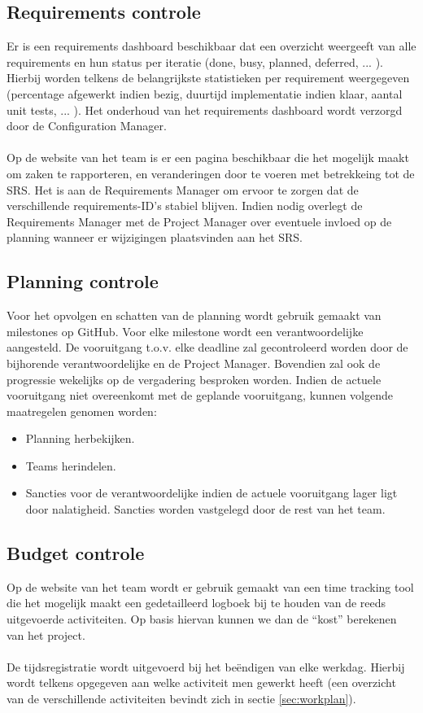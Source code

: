 \subsection{Requirements controle} \label{RequirementsControlPlan}
Er is een requirements dashboard beschikbaar dat een overzicht weergeeft van alle requirements en hun status per iteratie (done, busy, planned, deferred, ... ). Hierbij worden telkens de belangrijkste statistieken per requirement weergegeven (percentage afgewerkt indien bezig, duurtijd implementatie indien klaar, aantal unit tests, ... ). Het onderhoud van het requirements dashboard wordt verzorgd door de Configuration Manager.
\\
\\
Op de website van het team \cite{portalWebsite} is er een pagina beschikbaar die het mogelijk maakt om zaken te rapporteren, en veranderingen door te voeren met betrekkeing tot de SRS. Het is aan de Requirements Manager om ervoor te zorgen dat de verschillende requirements-ID's stabiel blijven. Indien nodig overlegt de Requirements Manager met de Project Manager over eventuele invloed op de planning wanneer er wijzigingen plaatsvinden aan het SRS.

\subsection{Planning controle} \label{sec:PlanningControle}
Voor het opvolgen en schatten van de planning wordt gebruik gemaakt van milestones op GitHub.  Voor elke milestone wordt een verantwoordelijke aangesteld. De vooruitgang t.o.v. elke deadline zal gecontroleerd worden door de bijhorende verantwoordelijke en de Project Manager. Bovendien zal ook de progressie wekelijks op de vergadering besproken worden. Indien de actuele vooruitgang niet overeenkomt met de geplande vooruitgang, kunnen volgende maatregelen genomen worden:
\begin{itemize}
	\item Planning herbekijken.
	\item Teams herindelen.
	\item Sancties voor de verantwoordelijke indien de actuele vooruitgang lager ligt door nalatigheid. Sancties worden vastgelegd door de rest van het team.
\end{itemize} 

\subsection{Budget controle} \label{sec:BudgetControle}
Op de website van het team \cite{portalWebsite} wordt er gebruik gemaakt van een time tracking tool die het mogelijk maakt een gedetailleerd logboek bij te houden van de reeds uitgevoerde activiteiten. Op basis hiervan kunnen we dan de ``kost'' berekenen van het project. 
\\
\\
De tijdsregistratie wordt uitgevoerd bij het be\"{e}ndigen van elke werkdag. Hierbij wordt telkens opgegeven aan welke activiteit men gewerkt heeft (een overzicht van de verschillende activiteiten bevindt zich in sectie \ref{sec:workplan}).

